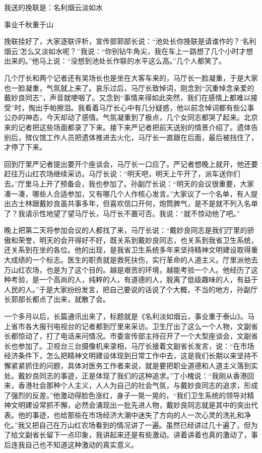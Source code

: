 \documentclass[12pt,oneside]{book}
\begin{document}
我送的挽联是：名利烟云淡如水

事业千秋重于山

挽联挂好了，大家逐联评析，宣传部郭部长说：``池处长你挽联是请谁作的？`名利烟云'怎么又淡如水呢？''我说：``你别钻牛角尖，我在车上一路想了几个小时才想出来的。''他马上说：``没想到池处长作联的水平这么高。''几个人都笑了。

几个厅长和两个记者还有吴场长也是坐在大客车来的，马厅长一脸凝重，于是大家也一脸凝重，气氛就上来了。哀乐过后，马厅长致悼词，刚念到``沉重悼念亲爱的戴妙良同志''，声音就哽咽了。又念到``事情来得如此突然，我们在感情上都难以接受''时，掏出手帕擦泪。我看着马厅长心中有几分疑惑，他以前念悼词都有些公事公办的神态，今天却动了感情。气氛凝重到了极点，几个女同志都哭了起来。北京来的记者把这些场面都录了下来。接下来严记者把前天送别的情景介绍了。遗体告别后，殡仪馆工作人员把遗体推进去火化，马厅长一直跟在后面，最后被挡住了，才停了下来。

回到厅里严记者提出要开个座谈会，马厅长一口应了。严记者想晚上就开，他还要赶往万山红农场继续采访。马厅长说：``明天吧，明天上午开了，派车送你们去。''厅里马上开了预备会，我也参加了。孙副厅长说：``明天的会议很重要，大家凑一凑，哪些人合适参加，又有哪几个人作核心发言。''大家议了一个名单，有人提出古士林跟戴妙良虽共事多年，但喜欢信口开何，炮筒脾气，是不是就不列入名单了？我请示性地望了望马厅长，马厅长不置可否。我说：``就不惊动他了吧。''

晚上把第二天将参加会议的人都找了来，马厅长说：``戴妙良同志是我们厅里的骄傲和荣誉，明天的会开得好不好，既关系到戴妙良同志，也关系到我省卫生系统，还关系到在坐的各位。他的出现，是我省卫生系统多年来坚持精神文明建设取得重大成绩的一个标志。医生的职责就是救死扶伤，实行革命的人道主义。厅里派他去万山红农场，也是为了这个目的。越是艰苦的环境，越能考验一个人。他经历了这种考验，是一个高尚的人，纯粹的人，有道德的人，脱离了低级趣味的人，有益于人民的人。''于是大家纷纷发言，把自己要说的话说了个大概，不当的地方，孙副厅长郭部长都点了出来，就散了会。

一个多月以后，长篇通讯出来了，标题就是《名利淡如烟云，事业重于泰山》。马上省市各大报刊电视台的记者都到厅里来采访。卫生厅出了这么一个人物，文副省长都惊动了，打了电话来问情况。市委宣传部主持召开了一个大型座谈会，文副省长也参加了。卫视台三台摄像机来录相，马厅长接着文副省长发言，说：``在市场经济条件下，怎么把精神文明建设体现到日常工作中去，这是我们长期以来坚持不懈紧紧抓住的问题，具体对医务工作者来说，就是要把职业道德和人道主义落到实处。戴妙良同志的事迹，正是体现了我们的这种追求。''丁小槐说：``我刚从香港回来，香港社会那种个人主义，人人为自己的社会气氛，与戴妙良同志的追求，形成了强烈的反差。''他激动得脸色涨红，身子一晃一晃的，``我们卫生系统的领导对精神文明建设常抓不懈，必然会涌现出一批先进人物，戴妙良同志就是其中的突出代表。他的事迹，也给那些在市场经济大潮中迷失了方向的人一次心灵的洗礼和净化。''我又把自己在万山红农场看到的情况讲了一遍。虽然已经讲过几十遍了，但为了给文副省长留下一点印象，我讲起来还是有些激动。讲着讲着也真的激动了，事后连我自己也不知道这种激动的真实意义。
\end{document}
